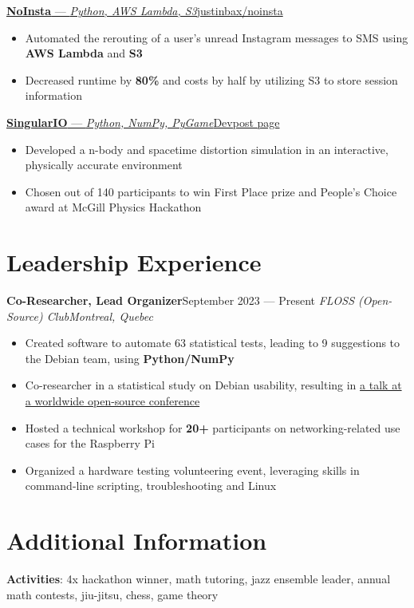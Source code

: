 \documentclass{article}
\newcommand{\newrole}[4]{
    {\normalfont\textbf{#1}\hfill#3}
    \newline
    \textit{#2}\hfill\textit{#4}
}
\newcommand{\shortlinkrole}[4]{
    {\href{#3}{\normalfont\textbf{#1} --- \textit{#2}\hfill#4\:\faExternalLink}\vspace*{-4pt}}
}
\newenvironment{bulletpoints}{\begin{itemize}\setlength\itemsep{-0.2em}}{\end{itemize}}
\begin{document}
\shortlinkrole{NoInsta}{Python, AWS Lambda, S3}{https://github.com/justinbax/brebeufhx}{justinbax/noinsta}
\begin{bulletpoints}
    \item Automated the rerouting of a user's unread Instagram messages to SMS using \textbf{AWS Lambda} and \textbf{S3}
    \item Decreased runtime by \textbf{80\%} and costs by half by utilizing S3 to store session information
\end{bulletpoints}

\shortlinkrole{SingularIO}{Python, NumPy, PyGame}{https://devpost.com/software/singulario}{Devpost page}
\begin{bulletpoints}
    \item Developed a n-body and spacetime distortion simulation in an interactive, physically accurate environment
    \item Chosen out of 140 participants to win First Place prize and People's Choice award at McGill Physics Hackathon
\end{bulletpoints}


\section*{Leadership Experience}
\newrole{Co-Researcher, Lead Organizer}{FLOSS (Open-Source) Club}{September 2023 --- Present}{Montreal, Quebec}
\begin{bulletpoints}
    \item Created software to automate 63 statistical tests, leading to 9 suggestions to the Debian team, using \textbf{Python/NumPy}
    \item Co-researcher in a statistical study on Debian usability, resulting in \href{https://debconf24.debconf.org/talks/49-debian-installer-usability-tests-take-2/}{a talk at a worldwide open-source conference\;\faExternalLink}
    \item Hosted a technical workshop for \textbf{20+} participants on networking-related use cases for the Raspberry Pi
    \item Organized a hardware testing volunteering event, leveraging skills in command-line scripting, troubleshooting and Linux
\end{bulletpoints}


\section*{Additional Information}
{\bfseries Activities}: 4x hackathon winner, math tutoring, jazz ensemble leader, annual math contests, jiu-jitsu, chess, game theory
\end{document}
